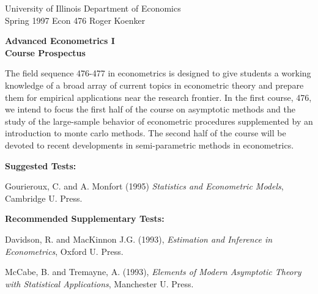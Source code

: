 \setlength{\textwidth}{170mm}
\setlength{\textheight}{220mm}
\setlength{\oddsidemargin}{0mm}
\setlength{\evensidemargin}{10mm}
\setlength{\topmargin}{-10mm}
\def\RR{\hbox{\raise.4ex\hbox{$\scriptstyle{|}$}\hskip-1.85pt R}}
\newcommand{\REF}{\nopagebreak\noindent{\large{\bf
      References}}\vspace{.2in}}

\newcommand{\Ref}[1]{\medskip\noindent\hangafter=1
      \hangindent=20pt\ignorespaces #1}
\pagestyle{empty}



\noindent
University of Illinois \hfill Department of Economics \\
Spring 1997 \hfill Econ 476 \hfill Roger Koenker

\begin{center}
\large{
{\bf Advanced Econometrics I \\
\vspace{2mm}
Course Prospectus}}
\end{center}

\vspace{10mm}
The field sequence 476-477 in econometrics is designed to give students a 
working knowledge of a broad array of current topics in econometric theory and 
prepare them for empirical applications near the research frontier.  In the 
first course, 476, we intend to focus the first half of the course on 
asymptotic methods and the study of the large-sample behavior of econometric 
procedures supplemented by an introduction to monte carlo 
methods.  The second half of the course will be devoted to recent developments 
in semi-parametric methods in econometrics.

\vspace{5mm}
\noindent
{\bf Suggested Tests:}

\Ref Gourieroux, C. and A. Monfort (1995) 
{\it Statistics and Econometric Models}, Cambridge U. Press.

\vspace{5mm}
\noindent
{\bf Recommended Supplementary Tests:}

\Ref Davidson, R. and MacKinnon J.G. (1993), {\em Estimation and Inference in 
Econometrics}, Oxford U. Press.

\Ref McCabe, B. and Tremayne, A. (1993), {\em Elements of Modern Asymptotic 
Theory with Statistical Applications}, Manchester U. Press.

